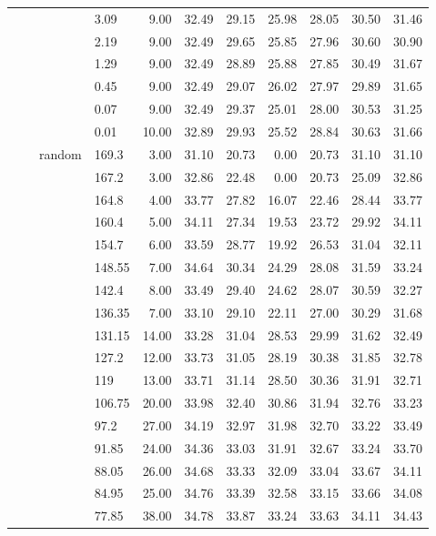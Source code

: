 \begin{longtable}{llllrrrrrrr}
   &  &  & 3.09 & 9.00 & 32.49 & 29.15 & 25.98 & 28.05 & 30.50 & 31.46 \\ 
   &  &  & 2.19 & 9.00 & 32.49 & 29.65 & 25.85 & 27.96 & 30.60 & 30.90 \\ 
   &  &  & 1.29 & 9.00 & 32.49 & 28.89 & 25.88 & 27.85 & 30.49 & 31.67 \\ 
   &  &  & 0.45 & 9.00 & 32.49 & 29.07 & 26.02 & 27.97 & 29.89 & 31.65 \\ 
   &  &  & 0.07 & 9.00 & 32.49 & 29.37 & 25.01 & 28.00 & 30.53 & 31.25 \\ 
   &  &  & 0.01 & 10.00 & 32.89 & 29.93 & 25.52 & 28.84 & 30.63 & 31.66 \\ 
   &  & random & 169.3 & 3.00 & 31.10 & 20.73 & 0.00 & 20.73 & 31.10 & 31.10 \\ 
   &  &  & 167.2 & 3.00 & 32.86 & 22.48 & 0.00 & 20.73 & 25.09 & 32.86 \\ 
   &  &  & 164.8 & 4.00 & 33.77 & 27.82 & 16.07 & 22.46 & 28.44 & 33.77 \\ 
   &  &  & 160.4 & 5.00 & 34.11 & 27.34 & 19.53 & 23.72 & 29.92 & 34.11 \\ 
   &  &  & 154.7 & 6.00 & 33.59 & 28.77 & 19.92 & 26.53 & 31.04 & 32.11 \\ 
   &  &  & 148.55 & 7.00 & 34.64 & 30.34 & 24.29 & 28.08 & 31.59 & 33.24 \\ 
   &  &  & 142.4 & 8.00 & 33.49 & 29.40 & 24.62 & 28.07 & 30.59 & 32.27 \\ 
   &  &  & 136.35 & 7.00 & 33.10 & 29.10 & 22.11 & 27.00 & 30.29 & 31.68 \\ 
   &  &  & 131.15 & 14.00 & 33.28 & 31.04 & 28.53 & 29.99 & 31.62 & 32.49 \\ 
   &  &  & 127.2 & 12.00 & 33.73 & 31.05 & 28.19 & 30.38 & 31.85 & 32.78 \\ 
   &  &  & 119 & 13.00 & 33.71 & 31.14 & 28.50 & 30.36 & 31.91 & 32.71 \\ 
   &  &  & 106.75 & 20.00 & 33.98 & 32.40 & 30.86 & 31.94 & 32.76 & 33.23 \\ 
   &  &  & 97.2 & 27.00 & 34.19 & 32.97 & 31.98 & 32.70 & 33.22 & 33.49 \\ 
   &  &  & 91.85 & 24.00 & 34.36 & 33.03 & 31.91 & 32.67 & 33.24 & 33.70 \\ 
   &  &  & 88.05 & 26.00 & 34.68 & 33.33 & 32.09 & 33.04 & 33.67 & 34.11 \\ 
   &  &  & 84.95 & 25.00 & 34.76 & 33.39 & 32.58 & 33.15 & 33.66 & 34.08 \\ 
   &  &  & 77.85 & 38.00 & 34.78 & 33.87 & 33.24 & 33.63 & 34.11 & 34.43 \\ 

\end{longtable}

